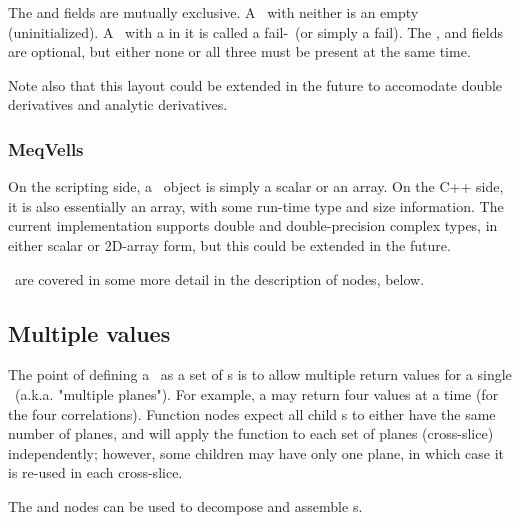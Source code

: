 \documentclass[10pt,twoside]{book}
\begin{document}
  \noindent\begin{tabular}{lp{}}
  \end{tabular}
                    
  The  and  fields are mutually exclusive. A \VellSet\ with
  neither is an empty (uninitialized). A \VellSet\ with a  in it is
  called a fail-\VellSet\ (or simply a fail). The ,
   and  fields are optional, but either
  none or all three must be present at the same time.
  
  Note also that this layout could be extended in the future to accomodate
  double derivatives and analytic derivatives.



\subsubsection{MeqVells}

  On the scripting side, a \Vells\ object is simply a scalar or an array. On
  the C++ side, it is also essentially an array, with some run-time type and
  size information. The current implementation supports double and
  double-precision complex types, in either scalar or 2D-array form, but this
  could be extended in the future.

  \Vells\ are covered in some more detail in the description of 
  nodes, below.

\subsection{Multiple values}

  The point of defining a \Result\ as a set of \VellSet{}s is to allow multiple
  return values for a single \Cells\ (a.k.a. "multiple planes"). For example, a
   may return four values at a time (for the four correlations).
  Function nodes expect all child \Result{}s to either have the same number of
  planes, and will apply the function to each set of planes (cross-slice)
  independently; however, some children may have only one plane, in which case
  it is re-used in each cross-slice.

  The  and  nodes can be used to decompose and
  assemble \Result{}s.
\end{document}
